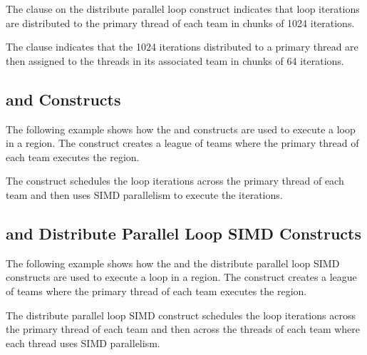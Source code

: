 The  clause on the distribute parallel loop construct indicates 
that loop iterations are distributed to the primary thread of each team in chunks 
of 1024 iterations.

The  clause indicates that the 1024 iterations distributed to 
a primary thread are then assigned to the threads in its associated team in chunks 
of 64 iterations.



\subsection{  and   Constructs}
\label{subsec:teams_distribute_simd}

The following example shows how the   and  
 constructs are used to execute a loop in a  region. 
The   construct creates a league of teams where the 
primary thread of each team executes the  region.

The   construct schedules the loop iterations across 
the primary thread of each team and then uses SIMD parallelism to execute the iterations.



\subsection{  and Distribute Parallel Loop SIMD Constructs}
\label{subsec:teams_distribute_parallel_simd}

The following example shows how the   and the distribute 
parallel loop SIMD constructs are used to execute a loop in a   
region. The   construct creates a league of teams 
where the primary thread of each team executes the  region.

The distribute parallel loop SIMD construct schedules the loop iterations across 
the primary thread of each team and then across the threads of each team where each 
thread uses SIMD parallelism.



